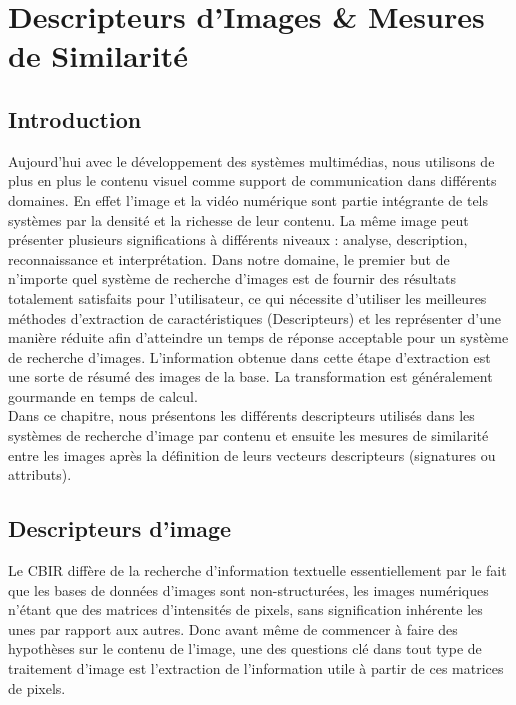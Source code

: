 
\chapter{Descripteurs d'Images \&  Mesures de Similarité} %

\label{Chapter2} %


\section{Introduction}
Aujourd’hui avec le développement des systèmes multimédias, nous utilisons de plus en plus le contenu visuel comme support de communication dans différents domaines. En effet l’image et la vidéo numérique sont partie intégrante de tels systèmes par la densité et la richesse de leur contenu. La même image peut présenter plusieurs significations à différents niveaux : analyse, description, reconnaissance et interprétation. Dans notre domaine, le premier but de n’importe quel système de recherche d’images est de fournir des résultats totalement satisfaits pour l'utilisateur, ce qui nécessite d’utiliser les meilleures méthodes d’extraction de caractéristiques (Descripteurs) et les représenter d’une manière réduite afin d’atteindre un temps de réponse acceptable pour un système de recherche d'images. L'information obtenue dans cette étape d'extraction est une sorte de résumé des images de la base. La transformation est généralement gourmande en temps de calcul.\\

Dans ce chapitre, nous présentons les différents descripteurs utilisés dans les systèmes de recherche d'image par contenu et ensuite les mesures de similarité entre les images après la définition de leurs vecteurs descripteurs (signatures ou attributs).





\section{Descripteurs d'image}
Le CBIR diffère de la recherche d’information textuelle essentiellement par le fait que les bases de données d’images sont non-structurées, les images numériques n’étant que des matrices d’intensités de pixels, sans signification inhérente les unes par rapport aux autres. Donc avant même de commencer à faire des hypothèses sur le contenu de l’image, une des questions clé dans tout type de traitement d’image est l’extraction de l'information utile à partir de ces matrices de pixels.\\

